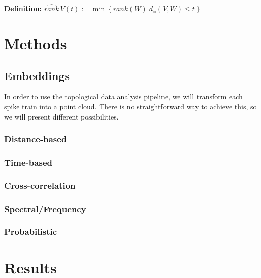 \documentclass[11pt,a4paper]{article}
\begin{document}
\textbf{Definition:}
$\widehat{rank}\,V(t) := \min\left\{ rank(W) | d_{\bowtie}(V,W)\leq t \right\}$





\section{Methods}
\subsection{Embeddings}
In order to use the topological data analysis pipeline, we will transform each spike train into a point cloud. There is no straightforward way to achieve this, so we will present different possibilities.

\subsubsection{Distance-based}

\subsubsection{Time-based}

\subsubsection{Cross-correlation}

\subsubsection{Spectral/Frequency}

\subsubsection{Probabilistic}




\section{Results}
\end{document}
